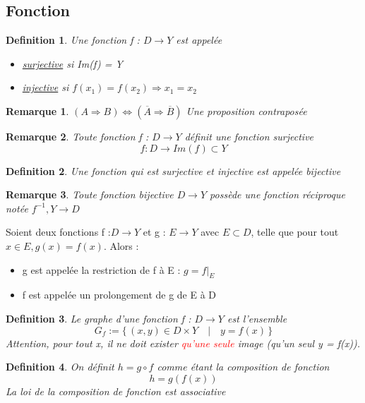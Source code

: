\documentclass{article}
\newtheorem{definition}{Definition}[section]
\newtheorem{remark}{Remarque}[section]
\begin{document}
\subsection{Fonction}
\begin{definition}
    Une fonction f : \(D \rightarrow Y\) est appelée 
    \begin{itemize}
        \item \underline{surjective} si Im(f) = Y
        \item \underline{injective} si \( f(x_1) = f(x_2) \Rightarrow x_1 = x_2 \)
    \end{itemize}
\end{definition}
\begin{remark}
    \( (A \Rightarrow B) \Leftrightarrow (\overline{A} \Rightarrow \overline{B}) \) \quad Une proposition contraposée
\end{remark}
\begin{remark}
    Toute fonction f : \(D \rightarrow Y\) définit une fonction surjective\\ \[f : D \rightarrow Im(f) \subset Y\]
\end{remark}
\begin{definition}
    Une fonction qui est surjective et injective est appelée bijective
\end{definition}
\begin{remark}
    Toute fonction bijective \(D \rightarrow Y\) possède une fonction réciproque notée \( f^{-1}, Y \rightarrow D\)
\end{remark}
Soient deux fonctions f :\(D \rightarrow Y\) et g : \(E \rightarrow Y\) avec \(E \subset D\), telle que pour tout \(x \in E, g(x) = f(x)\). Alors :
\begin{itemize}
    \item g est appelée la restriction de f à E : \(g = f|_E\)
    \item f est appelée un prolongement de g de E à D
\end{itemize}
\begin{definition}
    Le graphe d'une fonction f : \(D \rightarrow Y\) est l'ensemble
    \[ G_f := \{\, (x,y) \in D \times Y\quad |\quad y = f(x)\, \} \]
    \qquad Attention, pour tout x, il ne doit exister \textcolor{red}{qu'une seule} image (qu'un seul y = f(x)).
\end{definition}
\begin{definition}
    On définit \(h = g \circ f\) comme étant la composition de fonction 
    \[h = g(f(x))\]
    \qquad La loi de la composition de fonction est associative
\end{definition}
\newpage
\end{document}
